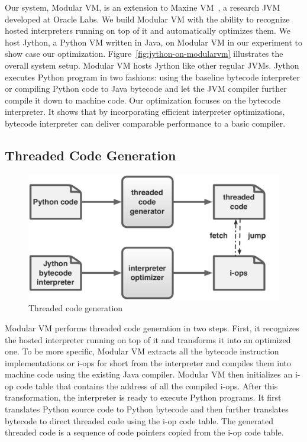 Our system, Modular VM, is an extension to Maxine VM~\cite{Wimmer2013}, a research JVM developed at Oracle Labs.
We build Modular VM with the ability to recognize hosted interpreters running on top of it and automatically optimizes them.
We host Jython, a Python VM written in Java, on Modular VM in our experiment to show case our optimization.
Figure~\ref{fig:jython-on-modularvm} illustrates the overall system setup.
Modular VM hosts Jython like other regular JVMs.
Jython executes Python program in two fashions: using the baseline bytecode interpreter or
compiling Python code to Java bytecode and let the JVM compiler further compile it down to machine code.
Our optimization focuses on the bytecode interpreter.
It shows that by incorporating efficient interpreter optimizations, bytecode interpreter can deliver comparable performance to a basic compiler.

\subsection{Threaded Code Generation}

\begin{figure}
\centering
\includegraphics[scale=.5]{figures/ch2-direct-threading-on-modularvm.pdf}
\caption{Threaded code generation}
\label{fig:direct-threading-on-modularvm}
\end{figure}

Modular VM performs threaded code generation in two steps.
First, it recognizes the hosted interpreter running on top of it and transforms it into an optimized one.
To be more specific, Modular VM extracts all the bytecode instruction implementations or i-ops for short from the interpreter and
compiles them into machine code using the existing Java compiler.
Modular VM then initializes an i-op code table that contains the address of all the compiled i-ops.
After this transformation, the interpreter is ready to execute Python programs.
It first translates Python source code to Python bytecode and then further translates bytecode to direct threaded code using the i-op code table.
The generated threaded code is a sequence of code pointers copied from the i-op code table.

